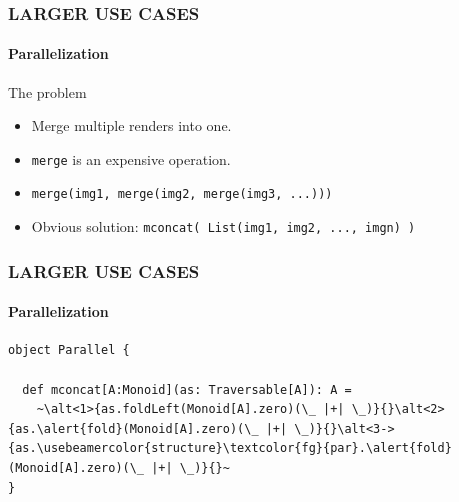 \documentclass{beamer}
\begin{document}
\begin{frame} \frametitle{LARGER USE CASES}
  \framesubtitle{Parallelization}
  \begin{block}{The problem}
    \begin{itemize}
      \item Merge multiple renders into one.
      \item \texttt{merge} is an expensive operation.
      \item \texttt{merge(img1, merge(img2, merge(img3, ...)))}
      \item Obvious solution: \texttt{mconcat( List(img1, img2, ..., imgn) )}
    \end{itemize}
  \end{block}

  \pause
  
\end{frame}

\begin{frame}[fragile] \frametitle{LARGER USE CASES}
  \framesubtitle{Parallelization}

  \begin{block}{}
  \begin{lstlisting}
object Parallel {

  def mconcat[A:Monoid](as: Traversable[A]): A =
    ~\alt<1>{as.foldLeft(Monoid[A].zero)(\_ |+| \_)}{}\alt<2>{as.\alert{fold}(Monoid[A].zero)(\_ |+| \_)}{}\alt<3->{as.\usebeamercolor{structure}\textcolor{fg}{par}.\alert{fold}(Monoid[A].zero)(\_ |+| \_)}{}~
}
  \end{lstlisting}
  \end{block}

\end{frame}
\end{document}
